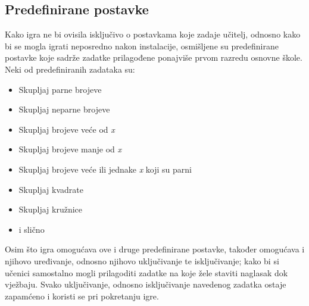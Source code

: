 \documentclass[times, utf8, zavrsni, numeric]{fer}
\begin{document}
		\subsection{Predefinirane postavke}
		Kako igra ne bi ovisila isključivo o postavkama koje zadaje učitelj, odnosno kako bi se mogla igrati neposredno nakon instalacije, osmišljene su predefinirane postavke koje sadrže zadatke prilagođene ponajviše prvom razredu osnovne škole.
		Neki od predefiniranih zadataka su: 
			\begin{itemize}
				\item  {Skupljaj parne brojeve}
				\item  {Skupljaj neparne brojeve}
				\item  {Skupljaj brojeve veće od \textit{x}}
				\item  {Skupljaj brojeve manje od \textit{x}}
				\item  {Skupljaj brojeve veće ili jednake \textit{x} koji su parni }
				\item  {Skupljaj kvadrate}
				\item  {Skupljaj kružnice}
				\item {i slično}
			\end{itemize}
		Osim što igra omogućava ove i druge predefinirane postavke, također omogućava i njihovo uređivanje, odnosno njihovo uključivanje te isključivanje; kako bi si učenici samostalno mogli prilagoditi zadatke na koje žele staviti naglasak dok vježbaju.
		Svako uključivanje, odnosno isključivanje navedenog zadatka ostaje zapamćeno i koristi se pri pokretanju igre.
		
\end{document}
